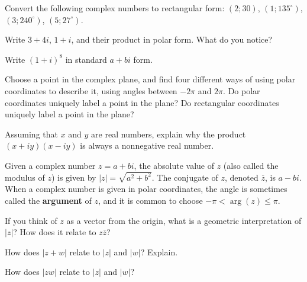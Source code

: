 \documentclass[space,nooutcomes]{ximera}
\begin{document}
\begin{problem}
Convert the following complex numbers to rectangular form: $(2; 30)$, $(1; 135^\circ)$, 
$(3; 240^\circ)$, $(5; 27^\circ)$.  
\vfill 
\end{problem}

\newpage 

\begin{problem}
Write $3 + 4i$, $1 + i$, and their product in polar form.  What do you notice?  
\vfill 
\end{problem}

\begin{problem}
Write $(1 + i)^8$ in standard $a + bi$ form.  
\vfill 
\end{problem}

\begin{problem}
Choose a point in the complex plane, and find four different ways of using polar coordinates to describe it, using angles between $-2\pi$ and $2\pi$.  
Do polar coordinates uniquely label a point in the plane?
Do rectangular coordinates uniquely label a point in the plane?
\vfill 
\end{problem}

\newpage 


\begin{problem}
Assuming that $x$ and $y$ are real numbers, explain why the product $(x+iy)(x-iy)$ is always a nonnegative real number. 
\vfill
\end{problem}

Given a complex number $z=a+bi$, the absolute value of $z$ (also called the modulus of $z$) is given by $|z|=\sqrt{a^2+b^2}$.  The conjugate of $z$, denoted $\overline{z}$, is $a-bi$.  When a complex number is given in polar coordinates, the angle is sometimes called the \textbf{argument} of $z$, and it is common to choose $-\pi<\arg(z)\le \pi$.  


\begin{problem}
If you think of $z$ as a vector from the origin, what is a geometric interpretation of $|z|$?  How does it relate to $z\overline{z}$?  
\vfill 
\end{problem}

\begin{problem}
How does $|z+w|$ relate to $|z|$ and $|w|$?  Explain.  
\vfill 
\end{problem}

\begin{problem}
How does $|zw|$ relate to $|z|$ and $|w|$?  
\vfill 
\end{problem}
\end{document}

